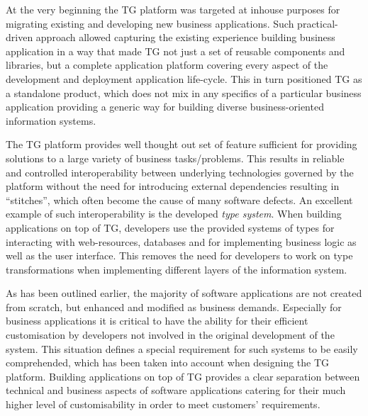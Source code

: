   At the very beginning the TG platform was targeted at inhouse purposes for migrating existing and developing new business applications.
  Such practical-driven approach allowed capturing the existing experience building business application in a way that made TG not just a set of reusable components and libraries, but a complete application platform covering every aspect of the development and deployment application life-cycle.
  This in turn positioned TG as a standalone product, which does not mix in any specifics of a particular business application providing a generic way for building diverse business-oriented information systems.

  The TG platform provides well thought out set of feature sufficient for providing solutions to a large variety of business tasks/problems.
  This results in reliable and controlled interoperability between underlying technologies governed by the platform without the need for introducing external dependencies resulting in ``stitches'', which often become the cause of many software defects.
  An excellent example of such interoperability is the developed \emph{type system}.
  When building applications on top of TG, developers use the provided systems of types for interacting with web-resources, databases and for implementing business logic as well as the user interface.
  This removes the need for developers to work on type transformations when implementing different layers of the information system.
  
  As has been outlined earlier, the majority of software applications are not created from scratch, but enhanced and modified as business demands.
  Especially for business applications it is critical to have the ability for their efficient customisation by developers not involved in the original development of the system.
  This situation defines a special requirement for such systems to be easily comprehended, which has been taken into account when designing the TG platform.
  Building applications on top of TG provides a clear separation between technical and business aspects of software applications catering for their much higher level of customisability in order to meet customers' requirements.